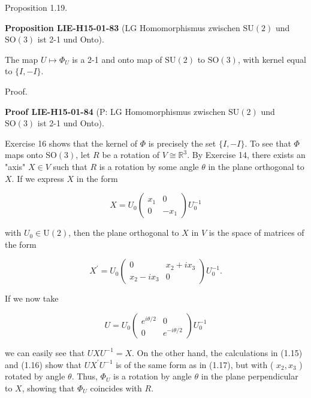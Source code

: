\documentclass[10pt, letterpaper]{article}
\newcommand{\SO}{\mathrm{SO}}
\newcommand{\SU}{\mathrm{SU}}
\newcommand{\CustomHeading}[3]{%
  \par\medskip\noindent%
  \textbf{#1 #2} \textnormal{(#3)}.\enskip%
}
\newenvironment{PROP}[2]{\begin{unitbox}\CustomHeading{Proposition}{#1}{#2}}{\end{unitbox}}
\newenvironment{PROOF}[2]{\begin{unitbox}\CustomHeading{Proof}{#1}{#2}}{\end{unitbox}}
\begin{document}
Proposition 1.19. 

\begin{PROP}{LIE-H15-01-83}{LG Homomorphismus zwischen $\SU(2)$ und $\SO(3)$ ist 2-1 und Onto}
The map $U \mapsto \Phi_{U}$ is a 2-1 and onto map of $\mathrm{SU}(2)$ to $\mathrm{SO}(3)$, with kernel equal to $\{I,-I\}$.
\end{PROP}


Proof. 

\begin{PROOF}{LIE-H15-01-84}{P: LG Homomorphismus zwischen $\SU(2)$ und $\SO(3)$ ist 2-1 und Onto}
Exercise 16 shows that the kernel of $\Phi$ is precisely the set $\{I,-I\}$. To see that $\Phi$ maps onto $\mathrm{SO}(3)$, let $R$ be a rotation of $V \cong \mathbb{R}^{3}$. By Exercise 14, there exists an "axis" $X \in V$ such that $R$ is a rotation by some angle $\theta$ in the plane orthogonal to $X$. If we express $X$ in the form

$$
X=U_{0}\left(\begin{array}{cc}
x_{1} & 0 \\
0 & -x_{1}
\end{array}\right) U_{0}^{-1}
$$

with $U_{0} \in \mathrm{U}(2)$, then the plane orthogonal to $X$ in $V$ is the space of matrices of the form

$$
X^{\prime}=U_{0}\left(\begin{array}{cc}
0 & x_{2}+i x_{3} \\
x_{2}-i x_{3} & 0
\end{array}\right) U_{0}^{-1} .
$$

If we now take

$$
U=U_{0}\left(\begin{array}{cc}
e^{i \theta / 2} & 0 \\
0 & e^{-i \theta / 2}
\end{array}\right) U_{0}^{-1}
$$

we can easily see that $U X U^{-1}=X$. On the other hand, the calculations in (1.15) and (1.16) show that $U X^{\prime} U^{-1}$ is of the same form as in (1.17), but with ( $x_{2}, x_{3}$ ) rotated by angle $\theta$. Thus, $\Phi_{U}$ is a rotation by angle $\theta$ in the plane perpendicular to $X$, showing that $\Phi_{U}$ coincides with $R$.
\end{PROOF}
\end{document}

